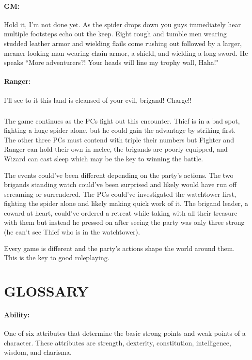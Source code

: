 \begin{multicols}{2}
\paragraph{GM:} Hold it, I'm not done yet.  As the spider drops down you guys immediately hear multiple footsteps echo out the keep.  Eight rough and tumble men wearing studded leather armor and wielding flails come rushing out followed by a larger, meaner looking man wearing chain armor, a shield, and wielding a long sword.  He speaks ``More adventurers?!  Your heads will line my trophy wall, Haha!"

\paragraph{Ranger:} I'll see to it this land is cleansed of your evil, brigand!  Charge!!

\subparagraph{} The game continues as the PCs fight out this encounter.  Thief is in a bad spot, fighting a huge spider alone, but he could gain the advantage by striking first.  The other three PCs must contend with triple their numbers but Fighter and Ranger can hold their own in melee, the brigands are poorly equipped, and Wizard can cast sleep which may be the key to winning the battle.  

The events could've been different depending on the party's actions.  The two brigands standing watch could've been surprised and likely would have run off screaming or surrendered.  The PCs could've investigated the watchtower first, fighting the spider alone and likely making quick work of it.  The brigand leader, a coward at heart, could've ordered a retreat while taking with all their treasure with them but instead he pressed on after seeing the party was only three strong (he can't see Thief who is in the watchtower).  

Every game is different and the party's actions shape the world around them.  This is the key to good roleplaying.
 
\section{GLOSSARY}

\paragraph{Ability:} One of six attributes that determine the basic strong points and weak points of a character.  These attributes are strength, dexterity, constitution, intelligence, wisdom, and charisma.  


\end{multicols}
